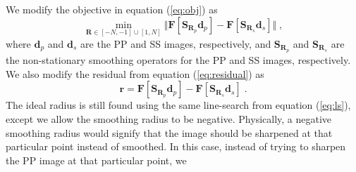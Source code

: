         We modify the objective in equation (\ref{eq:obj}) as
            \begin{equation}
                \label{eq:obj2}
                \min_{\mathbf{R} \in [-N, -1] \cup [1, N]} \Big \Vert \mathbf{F}[
                \mathbf{S}_{\mathbf{R}_p} \mathbf{d}_{p} ] - \mathbf{F}[
                \mathbf{S}_{\mathbf{R}_s}\mathbf{d}_{s}] \Big \Vert\;, 
            \end{equation}
        where $\mathbf{d}_p$ and $\mathbf{d}_s$ are the PP and SS images, respectively, and
        $\mathbf{S}_{\mathbf{R}_p}$ and $\mathbf{S}_{\mathbf{R}_s}$ are the non-stationary smoothing
        operators for the PP and SS images, respectively.
        We also modify the residual from equation (\ref{eq:residual}) as
            \begin{equation}
                \label{eq:residual2}
                \mathbf{r} = \mathbf{F}[\mathbf{S}_{\mathbf{R}_{p}}\mathbf{d}_p] -
                \textbf{F}[\mathbf{S}_{\mathbf{R}_s}\mathbf{d}_s]\;.
            \end{equation}
        The ideal radius is still found using the same line-search from equation (\ref{eq:ls}),
        except we allow the smoothing radius to be negative. Physically, a negative smoothing radius
        would signify that the image should be sharpened at that particular point instead of
        smoothed. In this case, instead of trying to sharpen the PP image at that particular point, 
        we
